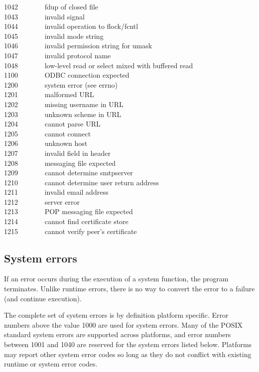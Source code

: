 1042 \ \ \ \ \ \ \ fdup of closed file \\
1043 \ \ \ \ \ \ \ invalid signal \\
1044 \ \ \ \ \ \ \ invalid operation to flock/fcntl\\
1045 \ \ \ \ \ \ \ invalid mode string\\
1046 \ \ \ \ \ \ \ invalid permission string for umask\\
1047 \ \ \ \ \ \ \ invalid protocol name\\
1048 \ \ \ \ \ \ \ low-level read or select mixed with buffered read\\
1100 \ \ \ \ \ \ \ ODBC connection expected\\
1200 \ \ \ \ \ \ \ system error (see errno)\\
1201 \ \ \ \ \ \ \ malformed URL\\
1202 \ \ \ \ \ \ \ missing username in URL\\
1203 \ \ \ \ \ \ \ unknown scheme in URL\\
1204 \ \ \ \ \ \ \ cannot parse URL\\
1205 \ \ \ \ \ \ \ cannot connect\\
1206 \ \ \ \ \ \ \ unknown host\\
1207 \ \ \ \ \ \ \ invalid field in header\\
1208 \ \ \ \ \ \ \ messaging file expected\\
1209 \ \ \ \ \ \ \ cannot determine smtpserver\\
1210 \ \ \ \ \ \ \ cannot determine user return address\\
1211 \ \ \ \ \ \ \ invalid email address\\
1212 \ \ \ \ \ \ \ server error\\
1213 \ \ \ \ \ \ \ POP messaging file expected\\
1214 \ \ \ \ \ \ \ cannot find certificate store\\
1215 \ \ \ \ \ \ \ cannot verify peer's certificate\\

\subsection*{System errors}

If an error occurs during the execution of a system
function, the program terminates. Unlike runtime errors, there is no way
to convert the error to a failure (and continue execution).

The complete set of system errors is by definition platform
specific. Error numbers above the value 1000 are used for system errors. Many of
the POSIX standard system errors are supported across platforms, and error
numbers between 1001 and 1040 are reserved for the system errors listed
below. Platforms may report other system error codes so long as they do not
conflict with existing runtime or system error codes.

